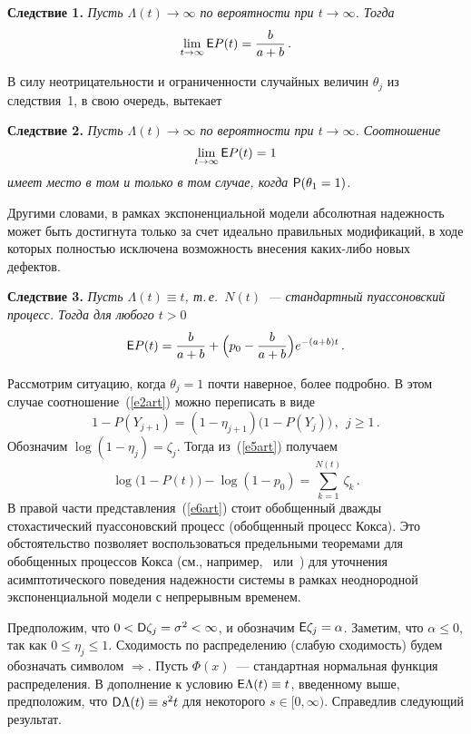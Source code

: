 \begin{multicols}{2}
\smallskip

\noindent
{\textbf{Следствие 1.}} {\it Пусть $\Lambda(t)\to\infty$ по вероятности
при $t\to\infty$. Тогда}
$$
\lim_{t\to\infty}{\sf E}P(t)=\displaystyle\frac{\displaystyle b\mathstrut}{\displaystyle a+b\mathstrut}\,.
$$

\smallskip

В силу неотрицательности и ограниченности случайных величин
$\theta_j$ из следствия~1, в свою очередь, вытекает

\smallskip

\noindent
{\textbf{Следствие 2.}} {\it Пусть $\Lambda(t)\to\infty$ по вероятности
при $t\to\infty$. Соотношение
$$
\lim_{t\to\infty}{\sf E}P(t)=1
$$
имеет место в том и только в том случае, когда ${\sf
P}(\theta_1=1)$.}

\smallskip

Другими словами, в рамках экспоненциальной модели абсолютная
надежность может быть достигнута только за счет идеально
правильных модификаций, в ходе которых полностью исключена
возможность внесения каких-либо новых дефектов.

\smallskip

\noindent
{\textbf{Следствие 3.}} {\it Пусть $\Lambda(t)\equiv t$, т.\,е.\ $N(t)$~--- стандартный пуассоновский процесс. Тогда для любого $t>0$}
$$
{\sf E}P(t)=\displaystyle\frac{\displaystyle b\mathstrut}{\displaystyle a+b\mathstrut}+\Big(p_0-\displaystyle\frac{\displaystyle b\mathstrut}{\displaystyle a+b\mathstrut}\Big)e^{-(a+b)t}\,.
$$

\smallskip

Рассмотрим ситуацию, когда $\theta_j=1$ почти наверное, более
подробно. В этом случае соотношение~(\ref{e2art}) можно переписать в виде
\begin{equation}
1-P(Y_{j+1})=(1-\eta_{j+1})\big(1-P(Y_j)\big)\,,\ \ j\ge 1\,.
\label{e5art}
\end{equation}
Обозначим $\log (1-\eta_j)=\zeta_j$. Тогда из~(\ref{e5art}) получаем
\begin{equation}
\log \big(1-P(t)\big)-\log
(1-p_0)=\sum_{k=1}^{N(t)}\zeta_k\,.\label{e6art}
\end{equation}
В правой части представления~(\ref{e6art}) стоит обобщенный дважды
стохастический пуассоновский процесс (обобщенный процесс Кокса).
Это обстоятельство позволяет воспользоваться предельными теоремами
для обобщенных процессов Кокса (см., например,~\cite{8art} или~\cite{9art}) для
уточнения асимптотического поведения надежности системы в рамках
неоднородной экспоненциальной модели с непрерывным временем.

Предположим, что $0<{\sf D}\zeta_j=\sigma^2<\infty$, и обозначим
${\sf E}\zeta_j=\alpha$. Заметим, что $\alpha\le0$, так как $0\le\eta_j\le1$. 
Сходимость по распределению (слабую сходимость)
будем обозначать символом $\Longrightarrow$. Пусть $\Phi(x)$~---
стандартная нормальная функция распределения. В дополнение к
условию ${\sf E}\Lambda(t)\equiv t$, введенному выше, предположим,
что ${\sf D}\Lambda(t)\equiv s^2t$ для некоторого $s\in[0,\infty)$.
Справедлив следующий результат.


\end{multicols}
